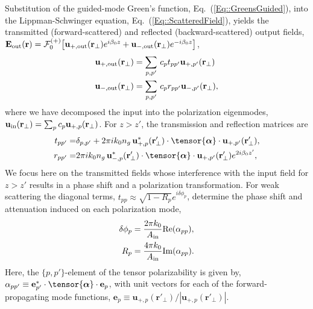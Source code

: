 \documentclass[preprint, aps,pra,onecolumn]{revtex4-1} %
\def\br{\mathbf{r}}
\newcommand{\erf}[1]{Eq.~(\ref{#1})}
\newcommand{\mbf}[1]{\mathbf{#1}}
\newcommand{\out}{{\rm out}}
\newcommand{\fwd}{+}
\newcommand{\bwd}{-}
\newcommand{\trans}{+}
\newcommand{\refl}{-}
\newcommand{\Eamp}{\mathcal{F}_0^{(+)}}
\begin{document}
Substitution of the guided-mode Green's function, \erf{Eq::GreensGuided}, into the Lippman-Schwinger equation, \erf{Eq::ScatteredField}, yields the transmitted (forward-scattered) and reflected (backward-scattered) output fields, $\mathbf{E}_{\out}(\br) = \Eamp \big[ \mathbf{u}_{\trans, \out} (\br_\perp) e^{i \beta_0 z} + \mathbf{u}_{\refl,\out} (\br_\perp) e^{-i \beta_0 z} \big]$, 
\begin{subequations}
	\begin{align}
		\mathbf{u}_{\trans, \out} (\br_\perp) &=  \sum_{p,p'}  \, c_{p} t_{pp'} \mathbf{u}_{\fwd, p'}(\br_\perp) \\ 
		\mathbf{u}_{\refl,\out} (\br_\perp) &=  \sum_{p,p'}  \, c_{p} r_{pp'} \mathbf{u}_{\bwd, p'}(\br_\perp),
	\end{align}
\end{subequations}
where we have decomposed the input into the polarization eigenmodes, $\mbf{u}_{\rm in}(\mbf{r}_\perp) = \sum_{p} c_{p} \mathbf{u}_{\fwd,p}(\br_\perp)$.  
For $z>z'$, the transmission and reflection matrices are 
\begin{subequations}
	\begin{align} \label{Eq::PolarizationTransformation}
		t_{pp'} =& \delta_{p,p'} +  2\pi i k_0 n_g \, \mathbf{u}^*_{+, p}(\br'_\perp) \cdot 
\tensor{\boldsymbol{\alpha}} \cdot \mathbf{u}_{+, p'}(\br'_\perp) , \\
		r_{pp'} =&  2\pi i k_0 n_g \, \mathbf{u}^*_{\bwd, p}(\br'_\perp) \cdot 
\tensor{\boldsymbol{\alpha}} \cdot \mathbf{u}_{\fwd, p'}(\br'_\perp) e^{2 i\beta_0 z'} , 
	\end{align} 
\end{subequations}
We focus here on the transmitted fields whose interference with the input field for $z>z'$ results in a phase shift and a polarization transformation.  
For weak scattering the diagonal terms, $t_{p p} \approx \sqrt{1-R_p}e^{i \delta \phi_p}$, determine the phase shift and attenuation induced on each polarization mode,
\begin{subequations}
	\begin{align}
		 \delta \phi_p &= \frac{2 \pi k_0}{A_{\rm in}} {\rm Re}(\alpha_{pp}),  \label{Eq::PhaseShift} \\
		R_p &=  \frac{4 \pi k_0}{A_{\rm in}} {\rm Im}(\alpha_{pp}) .\label{Eq::Attenuation} 
	\end{align} 
\end{subequations}
Here, the $\{p,p'\}$-element of the tensor polarizability is given by, $\alpha_{pp'} \equiv \mathbf{e}^*_{p'} \cdot \tensor{\boldsymbol{\alpha}}\cdot \mathbf{e}_{p}$, with unit vectors for each of the forward-propagating mode functions, $\mathbf{e}_{p}\equiv \mathbf{u}_{+,p}(\br'_\perp)/|\mathbf{u}_{+,p}(\br'_\perp)|$. 
\end{document}
